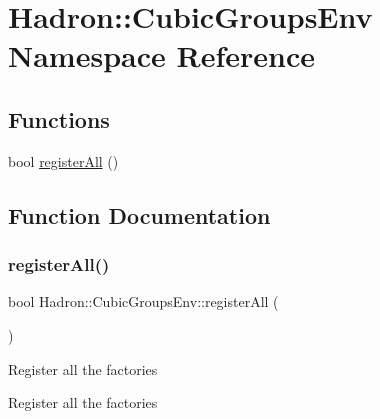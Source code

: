 \hypertarget{namespaceHadron_1_1CubicGroupsEnv}{}\section{Hadron\+:\+:Cubic\+Groups\+Env Namespace Reference}
\label{namespaceHadron_1_1CubicGroupsEnv}
\subsection*{Functions}
\begin{DoxyCompactItemize}
\item 
bool \mbox{\hyperlink{namespaceHadron_1_1CubicGroupsEnv_a72c88213059f1ce4ac24ef0b5032307b}{register\+All}} ()
\end{DoxyCompactItemize}


\subsection{Function Documentation}
\mbox{\label{namespaceHadron_1_1CubicGroupsEnv_a72c88213059f1ce4ac24ef0b5032307b}} 
\subsubsection{\texorpdfstring{registerAll()}{registerAll()}}
{\footnotesize\ttfamily bool Hadron\+::\+Cubic\+Groups\+Env\+::register\+All (\begin{DoxyParamCaption}{ }\end{DoxyParamCaption})}

Register all the factories

Register all the factories

